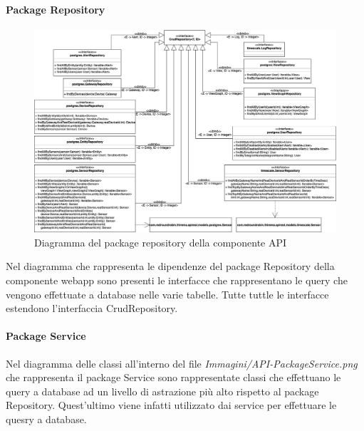 		\begin{landscape}
		\paragraph*{Package Repository}
		\begin{figure}[H]
			\centering
			\includegraphics[scale=0.500]{res/images/API/RepositoryPackage.png}
			\caption{Diagramma del package repository della componente API}
			\label{Diagramma 15}
		\end{figure}
		Nel diagramma che rappresenta le dipendenze del package Repository della componente webapp sono presenti le interfacce che rappresentano le query che vengono effettuate a database nelle varie tabelle. Tutte tuttle le interfacce estendono l'interfaccia CrudRepository.
		\paragraph*{Package Service}
		Nel diagramma delle classi all'interno del file \textit{Immagini/API-PackageService.png} che rappresenta il package Service sono rappresentate classi che effettuano le query a database ad un livello di astrazione più alto rispetto al package Repository. Quest'ultimo viene infatti utilizzato dai service per effettuare le quesry a database.
	

\end{landscape}
